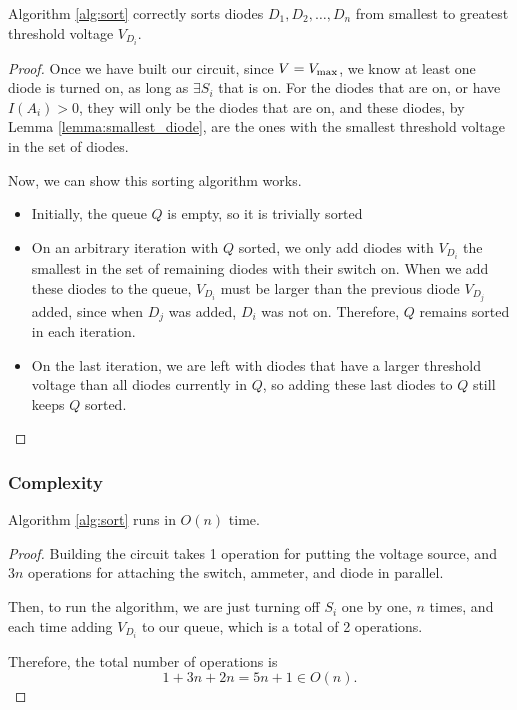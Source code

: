 \documentclass{article}
\begin{document}
\begin{theorem}
	Algorithm \ref{alg:sort} correctly sorts diodes $D_1, D_2, \dots, D_n$ from
	smallest to greatest threshold voltage $V_{D_i}$.
\end{theorem}
\begin{proof}
	Once we have built our circuit, since $V = V_\text{max}$, we know at least one
	diode is turned on, as long as $\exists S_i$ that is on.
	For the diodes that are on, or have $I(A_i) > 0$, they will only be the
	diodes that are on, and these diodes, by Lemma \ref{lemma:smallest_diode},
	are the ones with the smallest threshold voltage in the set of diodes.

	Now, we can show this sorting algorithm works.

	\begin{itemize}
		\item Initially, the queue $Q$ is empty, so it is trivially sorted
		\item On an arbitrary iteration with $Q$ sorted, we only add diodes
		with $V_{D_i}$ the smallest in the set of remaining diodes with their switch on.
		When we add these diodes to the queue, $V_{D_i}$ must be larger than the
		previous diode $V_{D_j}$ added, since when $D_j$ was added, $D_i$ was not on.
		Therefore, $Q$ remains sorted in each iteration.
		\item On the last iteration, we are left with diodes that have a larger threshold voltage than all diodes currently in $Q$,
		so adding these last diodes to $Q$ still keeps $Q$ sorted.
	\end{itemize}
\end{proof}

\subsubsection{Complexity}

\begin{theorem}
	Algorithm \ref{alg:sort} runs in $O(n)$ time.
\end{theorem}

\begin{proof}
	Building the circuit takes 1 operation for putting the voltage source, and $3n$ operations for
	attaching the switch, ammeter, and diode in parallel.

	Then, to run the algorithm, we are just turning off $S_i$ one by one, $n$
	times, and each time adding $V_{D_i}$ to our queue, which is a total of 2
	operations.

	Therefore, the total number of operations is
	\begin{equation}
		1 + 3n + 2n = 5n+1 \in O(n).
	\end{equation}
\end{proof}
\end{document}
